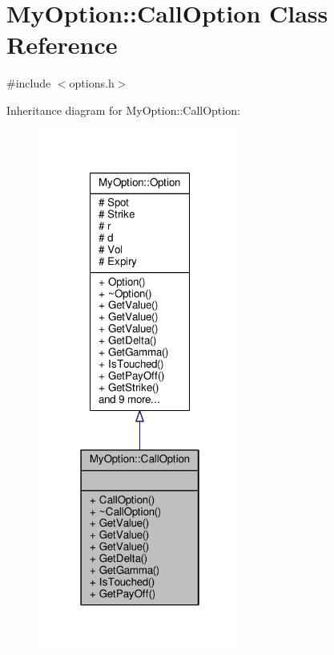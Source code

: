 \hypertarget{classMyOption_1_1CallOption}{}\section{My\+Option\+:\+:Call\+Option Class Reference}
\label{classMyOption_1_1CallOption}


{\ttfamily \#include $<$options.\+h$>$}



Inheritance diagram for My\+Option\+:\+:Call\+Option\+:
\nopagebreak
\begin{figure}[H]
\begin{center}
\leavevmode
\includegraphics[width=190pt]{classMyOption_1_1CallOption__inherit__graph}
\end{center}
\end{figure}


